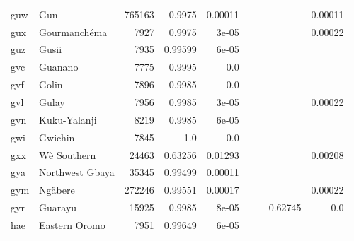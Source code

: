 \documentclass[11pt]{article}
\begin{document}
\begin{table*}[h]
{\begin{tabular}{llrrrrrrr}
guw         & Gun         & 765163         & 0.9975         & 0.00011         &          &          &          & 0.00011         \\

gux         & Gourmanchéma         & 7927         & 0.9975         & 3e-05         &          &          &          & 0.00022         \\

guz         & Gusii         & 7935         & 0.99599         & 6e-05         &          &          &          &          \\

gvc         & Guanano         & 7775         & 0.9995         & 0.0         &          &          &          &          \\

gvf         & Golin         & 7896         & 0.9985         & 0.0         &          &          &          &          \\

gvl         & Gulay         & 7956         & 0.9985         & 3e-05         &          &          &          & 0.00022         \\

gvn         & Kuku-Yalanji         & 8219         & 0.9985         & 6e-05         &          &          &          &          \\

gwi         & Gwichin         & 7845         & 1.0         & 0.0         &          &          &          &          \\

gxx         & Wè Southern         & 24463         & 0.63256         & 0.01293         &          &          &          & 0.00208         \\

gya         & Northwest Gbaya         & 35345         & 0.99499         & 0.00011         &          &          &          &          \\

gym         & Ngäbere         & 272246         & 0.99551         & 0.00017         &          &          &          & 0.00022         \\

gyr         & Guarayu         & 15925         & 0.9985         & 8e-05         &          &          & 0.62745         & 0.0         \\

hae         & Eastern Oromo         & 7951         & 0.99649         & 6e-05         &          &          &          &          \\


\end{tabular}}
\end{table*}
\end{document}
